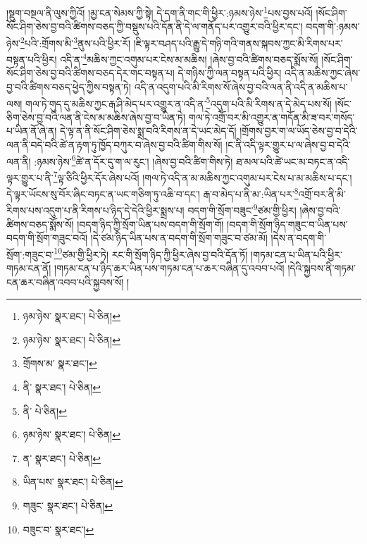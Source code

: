 །སྡུག་བསྔལ་ནི་ལུས་ཀྱིའོ། །མྱ་ངན་སེམས་ཀྱི་སྟེ། དེ་དག་ནི་གང་གི་ཕྱིར་:ཉམས་ཉེས་\footnote{ཉམ་ཉེས་  སྣར་ཐང་།  པེ་ཅིན། }པས་བྱས་པའོ། །སོང་ཤིག་སོང་ཤིག་ཅེས་བྱ་བའི་ཚིགས་བཅད་ཀྱི་བསྡུས་པའི་དོན་ནི་དེ་ལ་གནོད་པར་འགྱུར་བའི་ཕྱིར་དང་། བདག་གི་:ཉམས་ཉེས་\footnote{ཉམ་ཉེས་  སྣར་ཐང་།  པེ་ཅིན། }པའི་:གྲོགས་མི་\footnote{གྲོགས་མ་  སྣར་ཐང་། }ནུས་པའི་ཕྱིར་རོ། །ཇི་ལྟར་བཤད་པའི་རྒྱུ་དེ་གཉི་གའི་གནས་སྐབས་ཀྱང་མི་རིགས་པར་བསྟན་པའི་ཕྱིར། འདི་ན་\footnote{ནི་  སྣར་ཐང་།  པེ་ཅིན། }མཆིས་ཀྱང་འགུམ་པར་ངེས་མ་མཆིས། །ཞེས་བྱ་བའི་ཚིགས་བཅད་སྨོས་སོ། །སོང་ཤིག་སོང་ཤིག་ཅེས་བྱ་བའི་ཚིགས་བཅད་དེར་གང་བསྟན་པ། དེ་གཉིས་ཀྱི་ལན་བསྟན་པའི་ཕྱིར། འདི་ན་མཆིས་ཀྱང་ཞེས་བྱ་བའི་ཚིགས་བཅད་ཕྱེད་ཀྱིས་བསྟན་ཏེ། འདི་ན་འདུག་པའི་མི་རིགས་སོ་ཞེས་བྱ་བའི་ལན་ནི་འདི་ན་མཆིས་པ་ལས། གལ་ཏེ་གུད་དུ་མཆིས་ཀྱང་རྒ་ཤི་མེད་པར་འགྱུར་ན་འདི་ན་\footnote{ནི་  པེ་ཅིན། }འདུག་པའི་མི་རིགས་ན་དེ་མེད་པས་སོ། །སོང་ཅིག་ཅེས་བྱ་བའི་ལན་ནི་ངེས་མ་མཆིས་ཞེས་བྱ་བ་ཡིན་ཏེ། གལ་ཏེ་འགྲོ་བར་མི་འགྱུར་ན་གདོན་མི་ཟ་བར་གསོད་པ་ཡིན་ནོ་ཞེ་ན། དེ་ལྟ་ན་ནི་སོང་ཤིག་ཅེས་སྨྲ་བའི་རིགས་ན་དེ་ཡང་མེད་དོ། །གྲོགས་བྱར་ག་ལ་ཡོད་ཅེས་བྱ་བ་དེའི་ལན་ནི་བདེ་བའི་ཚེ་ན་རྟག་ཏུ་ཁྱོད་བཀུར་བ་ཞེས་བྱ་བའི་ཚིག་གིས་སོ། །ང་ནི་འདི་ལྟར་གྱུར་པ་ལ་ཞེས་བྱ་བ་དེའི་ལན་ནི། :ཉམས་ཉེས་\footnote{ཉམ་ཉེས་  སྣར་ཐང་།  པེ་ཅིན། }ཚེ་ན་དོར་དུ་ག་ལ་རུང་། །ཞེས་བྱ་བའི་ཚིག་གིས་ཏེ། ཐ་མལ་པའི་ཚེ་ཡང་མ་བཏང་ན་འདི་ལྟར་གྱུར་པ་ནི་\footnote{ན་  སྣར་ཐང་།  པེ་ཅིན། }ལྟ་ཅིའི་ཕྱིར་དོར་ཞེས་པའོ། །གལ་ཏེ་འདི་ན་མ་མཆིས་ཀྱང་འགུམ་པར་ངེས་པ་མ་མཆིས་པ་དང་། དེ་ལྟར་ཡོངས་སུ་བོར་ཞིང་བཏང་ན་ཡང་གཅིག་ཏུ་འཆི་བ་དང་། རྒ་བ་མེད་པ་ནི་མ་:ཡིན་པར་\footnote{ཡིན་པས་  སྣར་ཐང་།  པེ་ཅིན། }འགྲོ་བར་ནི་མི་རིགས་པས་འདུག་པ་ནི་རིགས་པ་ཉིད་དེ་དེའི་ཕྱིར་སྨྲས་པ། བདག་གི་སྲོག་བཟུང་\footnote{གཟུང་  སྣར་ཐང་།  པེ་ཅིན། }ཙམ་གྱི་ཕྱིར། །ཞེས་བྱ་བའི་ཚིགས་བཅད་སྨོས་སོ། །བདག་ཉིད་ཀྱི་སྲོག་ཡིན་པས་བདག་གི་སྲོག་གོ། །བདག་གི་སྲོག་ཉིད་གཟུང་བ་ཡིན་པས་བདག་གི་སྲོག་གཟུང་བའོ། །དེ་ཙམ་ཉིད་ཡིན་པས་ན་བདག་གི་སྲོག་གཟུང་བ་ཙམ་མོ། །དེས་ན་བདག་གི་སྲོག་:གཟུང་བ་\footnote{བཟུང་བ་  སྣར་ཐང་། }ཙམ་གྱི་ཕྱིར་ཏེ། རང་གི་སྲོག་ཉིད་ཀྱི་ཕྱིར་ཞེས་བྱ་བའི་དོན་ཏོ། །གཏམ་ངན་པ་ཡིན་པའི་ཕྱིར་གཏམ་ངན་ནོ། །གཏམ་ངན་པ་ཉིད་ཆར་ཡིན་པས་གཏམ་ངན་པ་ཆར་བཞིན་དུ་འབབ་པའོ། །དེའི་སྐྱབས་ནི་གཏམ་ངན་ཆར་བཞིན་འབབ་པའི་སྐྱབས་སོ། །
